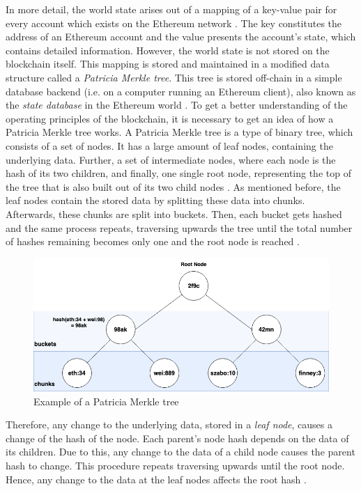 In more detail, the world state arises out of a mapping of a key-value pair for every account which exists 
on the Ethereum network . 
The key constitutes the address of an Ethereum account and the value presents 
the account's state, which contains detailed information. 
However, the world state is not stored on the blockchain itself. 
This mapping is stored and maintained in a modified data structure 
called a \textit{Patricia Merkle tree}. This tree is stored off-chain 
in a simple database backend (i.e. on a computer running an Ethereum client), 
also known as the \textit{state database} in the Ethereum world . 
To get a better understanding of the operating principles of the blockchain, 
it is necessary to get an idea of how a Patricia Merkle tree works. 
A Patricia Merkle tree is a type of binary tree, which consists 
of a set of nodes. It has a large amount of 
leaf nodes, containing the underlying data. 
Further, a set of intermediate nodes, where each node is 
the hash of its two children, and finally, one single root node, 
representing the top of the tree that is also built out of its 
two child nodes  .
As mentioned before, the leaf nodes contain the stored data 
by splitting these data into chunks. Afterwards, these chunks are split into buckets. 
Then, each bucket gets hashed and the same process repeats, traversing 
upwards the tree until the total number of hashes remaining becomes 
only one and the root node is reached . 

\begin{figure}[htbp]
	\centering
	\includegraphics[width=.75\linewidth]{./figures/merkle_tree.png}
	\caption{Example of a Patricia Merkle tree}
	\label{figure:merkle_tree}
\end{figure}

Therefore, any change to the underlying data, stored in a \textit{leaf node}, causes a change
of the hash of the node. Each parent's node hash depends on the data of its children. 
Due to this, any change to the data of a child node causes the parent hash to change. 
This procedure repeats traversing upwards until the root node. 
Hence, any change to the data at the leaf nodes affects the root hash . 

